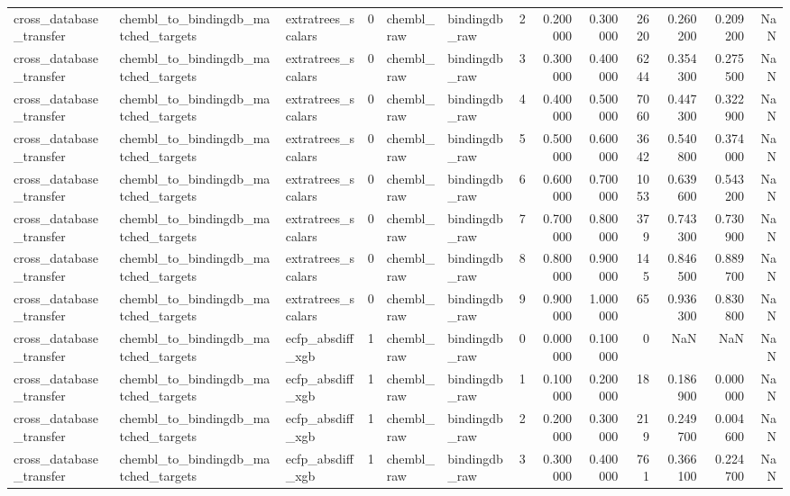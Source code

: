 \begin{longtable}{lllrllrrrrrrr}
cross\_database\_transfer & chembl\_to\_bindingdb\_matched\_targets & extratrees\_scalars & 0 & chembl\_raw & bindingdb\_raw & 2 & 0.200000 & 0.300000 & 2620 & 0.260200 & 0.209200 & NaN \\
cross\_database\_transfer & chembl\_to\_bindingdb\_matched\_targets & extratrees\_scalars & 0 & chembl\_raw & bindingdb\_raw & 3 & 0.300000 & 0.400000 & 6244 & 0.354300 & 0.275500 & NaN \\
cross\_database\_transfer & chembl\_to\_bindingdb\_matched\_targets & extratrees\_scalars & 0 & chembl\_raw & bindingdb\_raw & 4 & 0.400000 & 0.500000 & 7060 & 0.447300 & 0.322900 & NaN \\
cross\_database\_transfer & chembl\_to\_bindingdb\_matched\_targets & extratrees\_scalars & 0 & chembl\_raw & bindingdb\_raw & 5 & 0.500000 & 0.600000 & 3642 & 0.540800 & 0.374000 & NaN \\
cross\_database\_transfer & chembl\_to\_bindingdb\_matched\_targets & extratrees\_scalars & 0 & chembl\_raw & bindingdb\_raw & 6 & 0.600000 & 0.700000 & 1053 & 0.639600 & 0.543200 & NaN \\
cross\_database\_transfer & chembl\_to\_bindingdb\_matched\_targets & extratrees\_scalars & 0 & chembl\_raw & bindingdb\_raw & 7 & 0.700000 & 0.800000 & 379 & 0.743300 & 0.730900 & NaN \\
cross\_database\_transfer & chembl\_to\_bindingdb\_matched\_targets & extratrees\_scalars & 0 & chembl\_raw & bindingdb\_raw & 8 & 0.800000 & 0.900000 & 145 & 0.846500 & 0.889700 & NaN \\
cross\_database\_transfer & chembl\_to\_bindingdb\_matched\_targets & extratrees\_scalars & 0 & chembl\_raw & bindingdb\_raw & 9 & 0.900000 & 1.000000 & 65 & 0.936300 & 0.830800 & NaN \\
cross\_database\_transfer & chembl\_to\_bindingdb\_matched\_targets & ecfp\_absdiff\_xgb & 1 & chembl\_raw & bindingdb\_raw & 0 & 0.000000 & 0.100000 & 0 & NaN & NaN & NaN \\
cross\_database\_transfer & chembl\_to\_bindingdb\_matched\_targets & ecfp\_absdiff\_xgb & 1 & chembl\_raw & bindingdb\_raw & 1 & 0.100000 & 0.200000 & 18 & 0.186900 & 0.000000 & NaN \\
cross\_database\_transfer & chembl\_to\_bindingdb\_matched\_targets & ecfp\_absdiff\_xgb & 1 & chembl\_raw & bindingdb\_raw & 2 & 0.200000 & 0.300000 & 219 & 0.249700 & 0.004600 & NaN \\
cross\_database\_transfer & chembl\_to\_bindingdb\_matched\_targets & ecfp\_absdiff\_xgb & 1 & chembl\_raw & bindingdb\_raw & 3 & 0.300000 & 0.400000 & 761 & 0.366100 & 0.224700 & NaN \\

\end{longtable}
